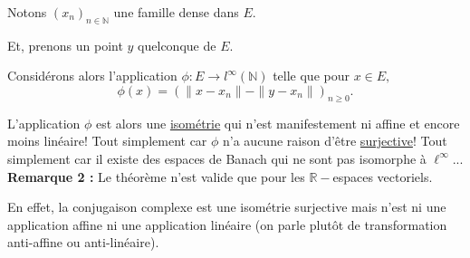 Notons $(x_{n})_{n\in\mathbb{N}}$ une famille dense dans $E.$ 

Et, prenons un point $y$ quelconque de $E.$

Considérons alors l'application $\displaystyle \phi : E \rightarrow l^{\infty}(\mathbb{N})$ telle que pour $x\in E,$ $$\phi(x)=(\|x-x_{n}\|-\|y-x_{n}\|)_{n\geq 0}.$$

L'application $\phi$ est alors une \underline{isométrie} qui n'est manifestement ni affine et encore moins linéaire!
Tout simplement car $\phi$ n'a aucune raison d'être \underline{surjective}! 
Tout simplement car il existe des espaces de Banach qui ne sont pas isomorphe à $\ell^{\infty}$...\\

\textbf{Remarque 2 : } Le théorème n'est valide que pour les $\mathbb{R}-$espaces vectoriels. 

En effet, la conjugaison complexe est une isométrie surjective mais n'est ni une application affine ni une application linéaire (on parle plutôt de transformation anti-affine ou anti-linéaire).   
